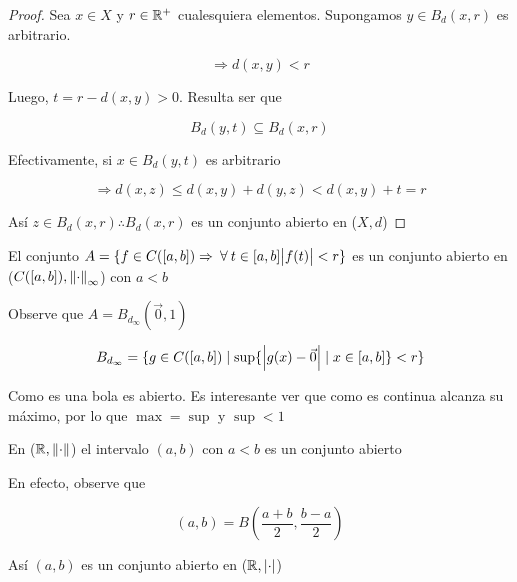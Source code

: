 \begin{proof}
    Sea $x \in X$ y $r \in \mathbb{R}^+$ cualesquiera elementos. Supongamos $y \in {B}_{d}(x,r)$ es arbitrario.

    \begin{equation*}
        \Rightarrow d(x,y) < r
    \end{equation*}

    Luego, $t = r-d(x,y) > 0$. Resulta ser que

    \begin{equation*}
        {B}_{d}(y,t) \subseteq {B}_{d}(x,r)
    \end{equation*}

    Efectivamente, si $x \in {B}_{d}(y,t) $ es arbitrario

    \begin{equation*}
        \Rightarrow d(x,z) \leqslant d(x,y) + d(y,z) < d(x,y) + t = r
    \end{equation*}

    Así $z \in {B}_{d}(x,r) \therefore {B}_{d}(x,r)$ es un conjunto abierto en ($X,d$)
\end{proof}

\begin{corollary}
    El conjunto $A = \{ f \in C([a,b]) \Rightarrow \: \forall \: t \in [a,b] \abs{f(t)} < r \}$ es un conjunto abierto en ($C([a,b]), {\norm{\cdot}}_{\infty}$) con $a<b$
\end{corollary}

\begin{orangeproof}
    Observe que $A =  B_{d_{\infty}}(\vec{0},1)$

    \begin{equation*}
        B_{d_{\infty}}  =  \{ g \in C([a,b]) \mid \sup  \{ \abs{g(x)-\vec{0}} \mid x \in [a,b] \} < r \}
    \end{equation*}

    Como es una bola es abierto. Es interesante ver que como es continua alcanza su máximo, por lo que $\max = \sup$ y $\sup < 1$
\end{orangeproof}

\begin{corollary}
    En ($\mathbb{R}, \norm{\cdot}$) el intervalo $(a,b)$ con $a < b$ es un conjunto abierto
\end{corollary}

\begin{orangeproof}
    En efecto, observe que

    \begin{equation*}
        (a,b) = B\left( \frac{a+b}{2}, \frac{b-a}{2} \right)
    \end{equation*}

    Así $(a,b)$ es un conjunto abierto en ($\mathbb{R}, \abs{\cdot}$)
\end{orangeproof}

